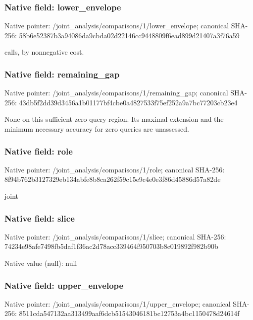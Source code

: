 \documentclass[10pt,a4paper]{article}
\begin{document}
\subsubsection{Native field: lower\_\allowbreak{}envelope}
Native pointer: /joint\_\allowbreak{}analysis/comparisons/1/lower\_\allowbreak{}envelope; canonical SHA-256: 58b6e52387b3a94086da9cbda02d22146cc9448809f6ead899d21407a3f76a59

\begingroup\raggedright{} calls,\allowbreak{} by nonnegative cost.\par\endgroup

\subsubsection{Native field: remaining\_\allowbreak{}gap}
Native pointer: /joint\_\allowbreak{}analysis/comparisons/1/remaining\_\allowbreak{}gap; canonical SHA-256: 43db5f2dd39d3456a1b01177bf4cbe0a4827533f75ef252a9a7bc77203cb23e4

\begingroup\raggedright\sloppy None on this sufficient zero-query region. Its maximal extension and the minimum necessary accuracy for zero queries are unassessed.\par\endgroup

\subsubsection{Native field: role}
Native pointer: /joint\_\allowbreak{}analysis/comparisons/1/role; canonical SHA-256: 8f94b762b3127329eb134abfe8b8ca262f59c15e9c4e0e3f86d45886d57a82de

\begingroup\raggedright\sloppy joint\par\endgroup

\subsubsection{Native field: slice}
Native pointer: /joint\_\allowbreak{}analysis/comparisons/1/slice; canonical SHA-256: 74234e98afe7498fb5daf1f36ac2d78acc339464f950703b8c019892f982b90b

Native value (null): null

\subsubsection{Native field: upper\_\allowbreak{}envelope}
Native pointer: /joint\_\allowbreak{}analysis/comparisons/1/upper\_\allowbreak{}envelope; canonical SHA-256: 8511cda547132aa313499aaf6dcb51543046181bc12753a4bc1150478d24614f
\end{document}
